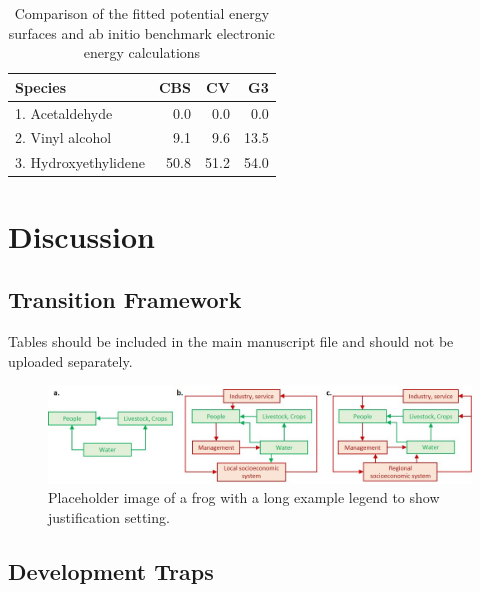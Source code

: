 \documentclass[9pt, twocolumn, twoside, lineno]{pnas-new}
\begin{document}
\begin{table}%
	\centering
	\caption{Comparison of the fitted potential energy surfaces and ab initio benchmark electronic energy calculations}
	\begin{tabular}{lrrr}
		Species & CBS & CV & G3 \\
		\midrule
		1. Acetaldehyde & 0.0 & 0.0 & 0.0 \\
		2. Vinyl alcohol & 9.1 & 9.6 & 13.5 \\
		3. Hydroxyethylidene & 50.8 & 51.2 & 54.0\\
		\bottomrule
	\end{tabular}
	
\end{table}

\section*{Discussion}

\subsection*{Transition Framework}
Tables should be included in the main manuscript file and should not be uploaded separately.

\begin{figure}%
	\centering
	\includegraphics[width=\linewidth]{../../figures/main_text/framework}
	\caption{Placeholder image of a frog with a long example legend to show justification setting.}
	\label{fig:framework}
\end{figure}

\subsection*{Development Traps}
\end{document}
